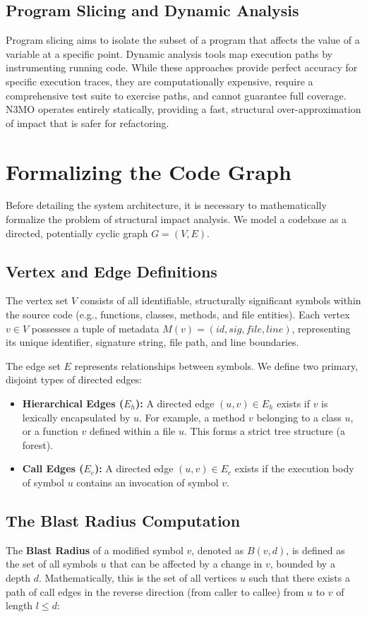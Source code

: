 \documentclass[conference]{IEEEtran}
\begin{document}
\subsection{Program Slicing and Dynamic Analysis}
Program slicing aims to isolate the subset of a program that affects the value of a variable at a specific point. Dynamic analysis tools map execution paths by instrumenting running code. While these approaches provide perfect accuracy for specific execution traces, they are computationally expensive, require a comprehensive test suite to exercise paths, and cannot guarantee full coverage. N3MO operates entirely statically, providing a fast, structural over-approximation of impact that is safer for refactoring.

\section{Formalizing the Code Graph}

Before detailing the system architecture, it is necessary to mathematically formalize the problem of structural impact analysis. We model a codebase as a directed, potentially cyclic graph $G = (V, E)$.

\subsection{Vertex and Edge Definitions}
The vertex set $V$ consists of all identifiable, structurally significant symbols within the source code (e.g., functions, classes, methods, and file entities). Each vertex $v \in V$ possesses a tuple of metadata $M(v) = (id, sig, file, line)$, representing its unique identifier, signature string, file path, and line boundaries.

The edge set $E$ represents relationships between symbols. We define two primary, disjoint types of directed edges:
\begin{itemize}
    \item \textbf{Hierarchical Edges ($E_h$):} A directed edge $(u, v) \in E_h$ exists if $v$ is lexically encapsulated by $u$. For example, a method $v$ belonging to a class $u$, or a function $v$ defined within a file $u$. This forms a strict tree structure (a forest).
    \item \textbf{Call Edges ($E_c$):} A directed edge $(u, v) \in E_c$ exists if the execution body of symbol $u$ contains an invocation of symbol $v$. 
\end{itemize}

\subsection{The Blast Radius Computation}
The \textbf{Blast Radius} of a modified symbol $v$, denoted as $B(v, d)$, is defined as the set of all symbols $u$ that can be affected by a change in $v$, bounded by a depth $d$. Mathematically, this is the set of all vertices $u$ such that there exists a path of call edges in the reverse direction (from caller to callee) from $u$ to $v$ of length $l \le d$:
\end{document}
